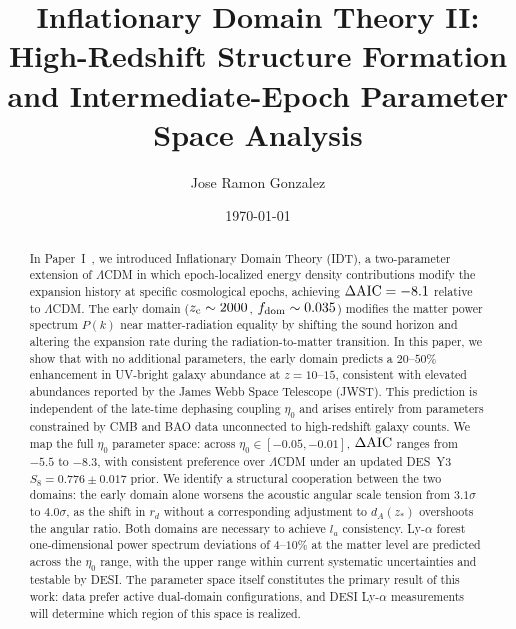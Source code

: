 \documentclass[aps,prd,twocolumn,superscriptaddress,nofootinbib]{revtex4-2}
\newcommand{\fdom}{f_{\rm dom}}
\newcommand{\zc}{z_{\rm c}}
\newcommand{\dAIC}{\Delta{\rm AIC}}
\begin{document}
\title{Inflationary Domain Theory II: High-Redshift Structure Formation and Intermediate-Epoch Parameter Space Analysis}

\author{Jose Ramon Gonzalez}

\date{\today}

\begin{abstract}
In Paper~I~\cite{Paper1}, we introduced Inflationary Domain Theory
(IDT), a two-parameter extension of $\Lambda$CDM in which
epoch-localized energy density contributions modify the expansion
history at specific cosmological epochs, achieving $\dAIC = -8.1$
relative to $\Lambda$CDM. The early domain ($\zc \sim 2000$,
$\fdom \sim 0.035$) modifies the matter power spectrum $P(k)$ near
matter-radiation equality by shifting the sound horizon and altering
the expansion rate during the radiation-to-matter transition. In
this paper, we show that with no additional parameters, the early
domain predicts a $20$--$50\%$ enhancement in UV-bright galaxy
abundance at $z = 10$--$15$, consistent with elevated abundances
reported by the James Webb Space Telescope (JWST). This prediction
is independent of the late-time dephasing coupling $\eta_0$ and
arises entirely from parameters constrained by CMB and BAO data
unconnected to high-redshift galaxy counts. We map the full $\eta_0$
parameter space: across $\eta_0 \in [-0.05, -0.01]$, $\dAIC$ ranges
from $-5.5$ to $-8.3$, with consistent preference over $\Lambda$CDM
under an updated DES~Y3 $S_8 = 0.776 \pm 0.017$ prior. We identify
a structural cooperation between the two domains: the early domain
alone worsens the acoustic angular scale tension from $3.1\sigma$ to
$4.0\sigma$, as the shift in $r_d$ without a corresponding
adjustment to $d_A(z_*)$ overshoots the angular ratio. Both domains
are necessary to achieve $l_a$ consistency. Ly-$\alpha$ forest
one-dimensional power spectrum deviations of $4$--$10\%$ at the
matter level are predicted across the $\eta_0$ range, with the
upper range within current systematic uncertainties and testable by
DESI. The parameter space itself constitutes the primary result of
this work: data prefer active dual-domain configurations, and DESI
Ly-$\alpha$ measurements will determine which region of this space
is realized.
\end{abstract}

\maketitle
\end{document}
